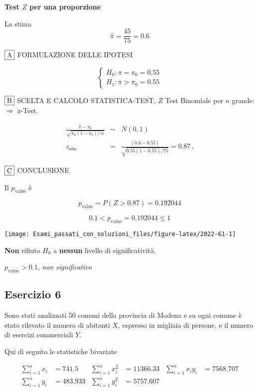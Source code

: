 \documentclass[
  11pt,
]{book}
\theoremstyle{mytheoremstyle}
\theoremstyle{mydefstyle}
\newenvironment{sol}
  {
  \begin{tcolorbox}[enhanced,breakable,arc=0.1mm,boxrule=1pt,colback=white,colframe=iblue,
  title=\bf \fontfamily{lmss}\selectfont \hspace{.5 cm} Soluzione,drop fuzzy shadow]

}{
\end{tcolorbox}
  }
\begin{document}
\begin{sol}
\textbf{Test \(Z\) per una proporzione}

La stima
\[\hat\pi=\frac { 45 } { 75 }= 0.6  \]

\(\fbox{A}\) FORMULAZIONE DELLE IPOTESI

\[\begin{cases}
   H_0: \pi = \pi_0=0.55 \\
   H_1: \pi > \pi_0=0.55 
   \end{cases}\]

\(\fbox{B}\) SCELTA E CALCOLO STATISTICA-TEST, \(Z\)
Test Binomiale per \(n\) grande: \(\Rightarrow\) z-Test.

\begin{eqnarray*}
   \frac{\hat\pi - \pi_{0}} {\sqrt {\pi_0(1-\pi_0)/\,n}}&\sim&N(0,1)\\
   z_{\text{obs}}
   &=& \frac{ ( 0.6 -  0.55 )} {\sqrt{ 0.55 (1- 0.55 )/ 75 }}
   =   0.87 \,.
   \end{eqnarray*}

\(\fbox{C}\) CONCLUSIONE

Il \(p_{\text{value}}\) è

\[ p_{\text{value}} = P(Z>0.87)=0.192044 \]

\[
 0.1 < p_\text{value}= 0.192044 \leq 1 
\]

\begin{center}\texttt{[image: Esami\_passati\_con\_soluzioni\_files/figure-latex/2022-61-1]} \end{center}

\textbf{Non} rifiuto \(H_0\) a \textbf{nessun}
livello di significatività,

\(p_\text{value}>0.1\),
\emph{non significativo}

\end{sol}

\subsection{Esercizio 6}\label{esercizio-6-12}

Sono stati analizzati 50 comuni della provincia di Modena e su ogni comune è stato rilevato
il numero di abitanti \(X\), espresso in migliaia di persone, e il numero di esercizi commerciali \(Y\).

Qui di seguito le statistiche bivariate

\begin{align*}
  \sum_{i=1}^n x_i &= 741.5 &\sum_{i=1}^n x_i^2 &= 11366.33 &\sum_{i=1}^n x_i y_i &= 7568.707\\
  \sum_{i=1}^n y_i &= 483.933 & \sum_{i=1}^n y_i^2 &= 5757.607 &
\end{align*}
\end{document}
